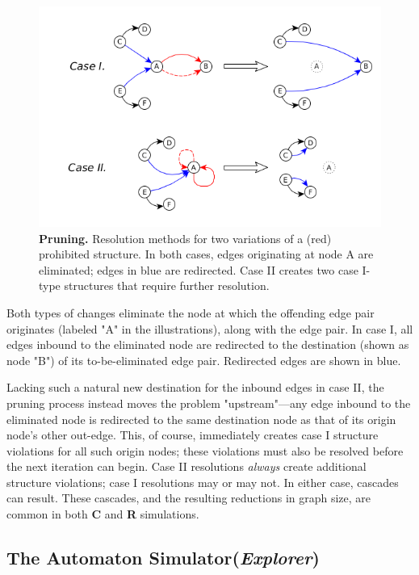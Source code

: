 \documentclass{tufte-handout}
\begin{document}
\begin{figure}
\includegraphics{pruning.png}
\caption{\textbf{Pruning.} Resolution methods for two variations of a (red) prohibited structure.
In both cases, edges originating at node A are eliminated; edges in blue are redirected.
Case II creates two case I-type structures that require further resolution.}
\label{fig:Pruning}
\end{figure}

Both types of changes eliminate the node at which the offending edge pair
originates (labeled "A" in the illustrations), along with the edge pair.
In case I, all edges inbound to the eliminated node are redirected to 
the destination (shown as node "B") of its to-be-eliminated edge pair.
Redirected edges are shown in blue.

Lacking such a natural new destination for the inbound edges in case II, the
pruning process instead moves the problem "upstream"---any edge inbound to
the eliminated node is redirected to the same destination node as that of
its origin node's other out-edge. This, of course, immediately creates
case I structure violations for all such origin nodes; these violations must also be
resolved before the next iteration can begin.
Case II resolutions \textit{always} create additional structure violations;
case I resolutions may or may not. In either case, cascades can result. These
cascades, and the resulting reductions in graph size, are common in both
\textbf{C} and \textbf{R} simulations.

\subsection{The Automaton Simulator(\textit{Explorer})}
\end{document}
